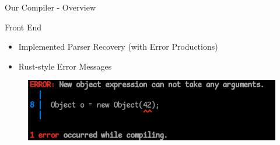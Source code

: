 \documentclass[en,16:9]{sdqbeamer}
\begin{document}
\begin{frame}{Our Compiler - Overview}
	\begin{figure}
		\centering
		
	\end{figure}
\end{frame}

\begin{frame}{Front End}
	\begin{itemize}
		\item Implemented Parser Recovery (with Error Productions)
		\item Rust-style Error Messages
	\end{itemize}

	\begin{figure}
		\centering
		\includegraphics{images/error_message.png}
	\end{figure}
\end{frame}
\end{document}
